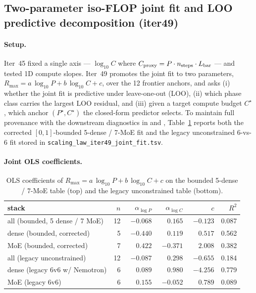 \subsection{Two-parameter iso-FLOP joint fit and LOO predictive decomposition (iter49)}
\label{sec:scaling-law-iter49}
\label{sec:iter49}
\paragraph{Setup.}
Iter~45 fixed a single axis --- $\log_{10}C$ where $C_{\rm proxy}=P\cdot n_{\rm steps}\cdot L_{\rm bar}$ --- and tested 1D compute slopes. Iter~49 promotes the joint fit to two parameters, $R_{\max}=a\,\log_{10}P + b\,\log_{10}C + c$, over the 12 frontier anchors, and asks (i) whether the joint fit is predictive under leave-one-out (LOO), (ii) which phase class carries the largest LOO residual, and (iii) given a target compute budget $C^{\star}$, which anchor $(P^{\star}, C^{\star})$ the closed-form predictor selects. To maintain full provenance with the downstream diagnostics in  and , Table~\ref{tab:iter49-ols} reports both the corrected $[0,1]$-bounded 5-dense / 7-MoE fit and the legacy unconstrained 6-vs-6 fit stored in \texttt{scaling\_law\_iter49\_joint\_fit.tsv}.

\paragraph{Joint OLS coefficients.}
\begin{table}[ht]
\centering\small
\begin{tabular}{lrrrrr}
\toprule
stack & $n$ & $\alpha_{\log P}$ & $\alpha_{\log C}$ & $c$ & $R^2$ \\
\midrule
 all (bounded, 5 dense / 7 MoE) & 12 & $-0.068$ & $\phantom{-}0.165$ & $-0.123$ & 0.087 \\
 dense (bounded, corrected)     &  5 & $-0.440$ & $\phantom{-}0.119$ & $\phantom{-}0.517$ & 0.562 \\
 MoE (bounded, corrected)       &  7 & $\phantom{-}0.422$ & $-0.371$ & $\phantom{-}2.008$ & 0.382 \\
\midrule
 all (legacy unconstrained)     & 12 & $-0.087$ & $\phantom{-}0.298$ & $-0.655$ & 0.184 \\
 dense (legacy 6v6 w/ Nemotron) &  6 & $\phantom{-}0.089$ & $\phantom{-}0.980$ & $-4.256$ & 0.779 \\
 MoE (legacy 6v6)               &  6 & $\phantom{-}0.155$ & $-0.052$ & $\phantom{-}0.789$ & 0.089 \\
\bottomrule
\end{tabular}
\caption{OLS coefficients of $R_{\max}=a\,\log_{10}P + b\,\log_{10}C + c$ on the bounded 5-dense / 7-MoE table (top) and the legacy unconstrained table (bottom).}
\label{tab:iter49-ols}
\end{table}

